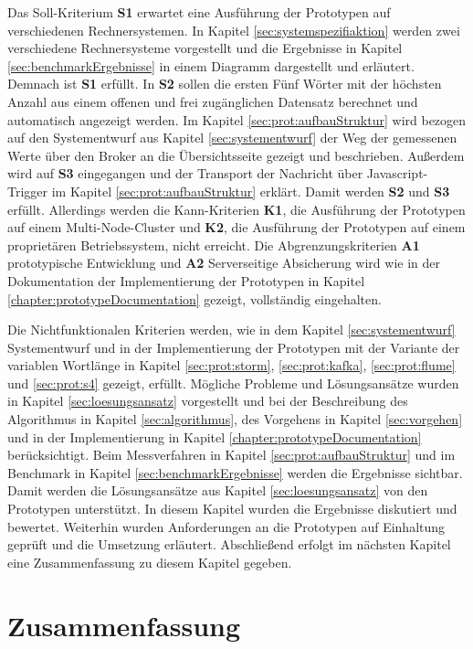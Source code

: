 Das Soll-Kriterium \textbf{S1} erwartet eine Ausführung der Prototypen auf verschiedenen Rechnersystemen. In Kapitel \ref{sec:systemspezifiaktion} werden zwei verschiedene Rechnersysteme vorgestellt und die Ergebnisse in Kapitel \ref{sec:benchmarkErgebnisse} in einem Diagramm dargestellt und erläutert. Demnach ist \textbf{S1} erfüllt. In \textbf{S2} sollen die ersten Fünf Wörter mit der höchsten Anzahl aus einem offenen und frei zugänglichen Datensatz berechnet und automatisch angezeigt werden. Im Kapitel \ref{sec:prot:aufbauStruktur} wird bezogen auf den Systementwurf aus Kapitel \ref{sec:systementwurf} der Weg der gemessenen Werte über den Broker an die Übersichtsseite gezeigt und beschrieben. Außerdem wird auf \textbf{S3} eingegangen und der Transport der Nachricht über Javascript-Trigger im Kapitel \ref{sec:prot:aufbauStruktur} erklärt. Damit werden \textbf{S2} und \textbf{S3} erfüllt. Allerdings werden die Kann-Kriterien \textbf{K1}, die Ausführung der Prototypen auf einem Multi-Node-Cluster und \textbf{K2}, die Ausführung der Prototypen auf einem proprietären Betriebssystem, nicht erreicht. Die Abgrenzungskriterien \textbf{A1} prototypische Entwicklung und \textbf{A2} Serverseitige Absicherung wird wie in der Dokumentation der Implementierung der Prototypen in Kapitel \ref{chapter:prototypeDocumentation} gezeigt, vollständig eingehalten.

Die Nichtfunktionalen Kriterien werden, wie in dem Kapitel \ref{sec:systementwurf} Systementwurf und in der Implementierung der Prototypen mit der Variante der variablen Wortlänge in Kapitel \ref{sec:prot:storm}, \ref{sec:prot:kafka}, \ref{sec:prot:flume} und \ref{sec:prot:s4} gezeigt, erfüllt. Mögliche Probleme und Lösungsansätze wurden in Kapitel \ref{sec:loesungsansatz} vorgestellt und bei der Beschreibung des Algorithmus in Kapitel \ref{sec:algorithmus}, des Vorgehens in Kapitel \ref{sec:vorgehen} und in der Implementierung in Kapitel \ref{chapter:prototypeDocumentation} berücksichtigt. Beim Messverfahren in Kapitel \ref{sec:prot:aufbauStruktur} und im Benchmark in Kapitel \ref{sec:benchmarkErgebnisse} werden die Ergebnisse sichtbar. Damit werden die Lösungsansätze aus Kapitel \ref{sec:loesungsansatz} von den Prototypen unterstützt. In diesem Kapitel wurden die Ergebnisse diskutiert und bewertet. Weiterhin wurden Anforderungen an die Prototypen auf Einhaltung geprüft und die Umsetzung erläutert. Abschließend erfolgt im nächsten Kapitel eine Zusammenfassung zu diesem Kapitel gegeben.


\section{Zusammenfassung}

